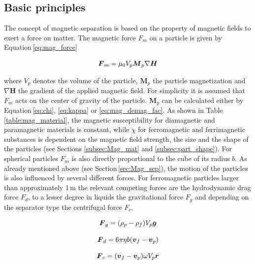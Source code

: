 \subsection{Basic principles}
\label{subsec:bas_princ}
The concept of magnetic separation is based on the property of magnetic fields to exert a force on matter. The magnetic force $F_{m}$ on a particle is given by Equation\,\ref{eq:mag_force}

\begin{equation}
\label{eq:mag_force}
\centering
\boldsymbol{F}_{m} = \mu_{0}V_{p}\boldsymbol{M}_{p}\nabla\boldsymbol{H}
\end{equation}

where $V_{p}$ denotes the volume of the particle, $\boldsymbol{M}_{p}$ the particle magnetization and $\nabla\boldsymbol{H}$ the gradient of the applied magnetic field. For simplicity it is assumed that $F_{m}$ acts on the center of gravity of the particle. $\boldsymbol{M}_{p}$ can be calculated either by Equation\,\ref{eq:chi}, \ref{eq:kappa} or \ref{eq:mag_demag_fac}. As shown in Table\,\ref{table:mag_material}, the magnetic susceptibility for diamagnetic and paramagnetic materials is constant, while $\chi$ for ferromagnetic and ferrimagnetic substances is dependent on the magnetic field strength, the size and the shape of the particles (see Sections \ref{subsec:Mag_mat} and \ref{subsec:part_shape}). For spherical particles $F_{m}$ is also directly proportional to the cube of its radius $b$. \newline
As already mentioned above (see Section\,\ref{sec:Mag_sep}), the motion of the particles is also influenced by several different  forces. For ferromagnetic particles larger than approximately 1\,\textmu m the relevant competing forces are  the hydrodynamic drag force $F_{d}$, to a lesser degree in liquids the gravitational force $F_{g}$ and depending on the separator type the centrifugal force $F_{c}$.  


\begin{equation}
\label{eq:grav_force}
\centering
\boldsymbol{F}_{g} = (\rho_{p}-\rho_{f})V_{p}\boldsymbol{g}
\end{equation}

\begin{equation}
\label{eq:drag_force}
\centering
\boldsymbol{F}_{d} = 6\pi\eta b(\boldsymbol{v}_{f}-\boldsymbol{v}_{p})
\end{equation}

\begin{equation}
\label{eq:cent_force}
\centering
\boldsymbol{F}_{c} = (\boldsymbol{v}_{f}-\boldsymbol{v}_{p})\omega V_{p}\boldsymbol{r}
\end{equation}

